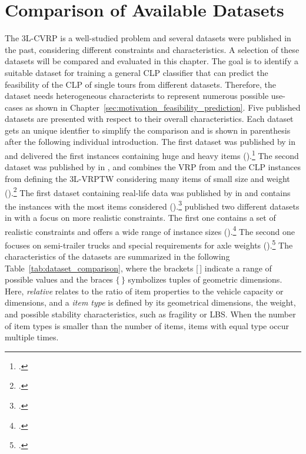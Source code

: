 \chapter{Comparison of Available Datasets}
\label{sec:dataset_selection}

The \gls{3L-CVRP} is a well-studied problem and several datasets were published in the past, considering
different constraints and characteristics. A selection of these datasets will be compared and evaluated
in this chapter. The goal is to identify a suitable dataset for training a general \gls{CLP} classifier that can predict
the feasibility of the \gls{CLP} of single tours from different datasets. Therefore, the dataset needs
heterogeneous characterists to represent numerous possible use-cases
as shown in Chapter~\ref{sec:motivation_feasibility_prediction}. Five published  datasets are presented with respect to their overall characteristics.
Each dataset gets an unique identfier to simplify the comparison and is shown in parenthesis
after the following individual introduction. The first  dataset was published by \citeauthor*{gendreau_tabu_2006} in
\citeyear{gendreau_tabu_2006} and delivered the first  instances containing huge and heavy items (\gendreauDataSet).\footcite[cf.][]{gendreau_tabu_2006}
The second dataset was published by \citeauthor*{moura_integrated_2009} in \citeyear{moura_integrated_2009},
and combines the \gls{VRP} from \citeauthor*{solomon_algorithms_1987} and the \gls{CLP} instances from
\citeauthor*{bischoff_issues_1995} defining the \gls{3L-VRPTW} considering
many items of small size and weight (\mouraDataSet).\footcites[cf.][]{solomon_algorithms_1987,bischoff_issues_1995}[][]{moura_integrated_2009}
The first dataset containing real-life data was published by \citeauthor*{ceschia_local_2013} in \citeyear{ceschia_local_2013}
and contains the instances with the most items considered (\ceschiaDataSet).\footcite[cf.][]{ceschia_local_2013}
\citeauthor*{krebs_advanced_2021} published two different datasets in
\citeyear{krebs_advanced_2021} with a focus on more realistic constraints. The first one contains a set
of realistic constraints and offers a wide range of instance sizes (\krebsADataSet).\footcite[cf.][]{krebs_advanced_2021}
The second one focuses on semi-trailer trucks and special requirements for axle weights (\krebsBDataSet).\footcite[cf.][]{krebs_axle_2021}
The characteristics of the datasets are summarized in the following Table~\ref{tab:dataset_comparison},
where the brackets [\,] indicate a range of possible values and the braces $\{\,\}$ symbolizes tuples of geometric dimensions.
Here, \textit{relative} relates to the ratio of item properties to the vehicle capacity or dimensions,
and a \textit{item type} is defined by its geometrical dimensions, the weight, and possible stability characteristics, such as fragility or \gls{LBS}.
When the number of item types is smaller than the number of items, items with equal type occur multiple times.


